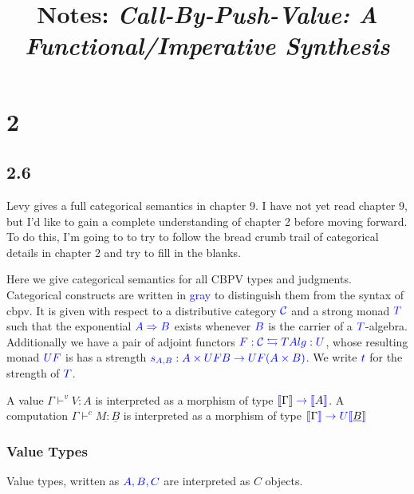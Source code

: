 \documentclass{article}
\title{Notes: \emph{Call-By-Push-Value: A Functional/Imperative Synthesis} }
\newcommand{\sem}[1]{\llbracket #1 \rrbracket}
\newcommand{\gr}[1]{\textcolor{blue}{#1}}
\newcommand{\bk}[1]{\textcolor{black}{#1}}
\begin{document}
\maketitle
 
\section*{2}

\subsection*{2.6}

Levy gives a full categorical semantics in chapter 9. I have not yet read chapter 9, but I'd like to gain a complete understanding of chapter 2 before moving forward. To do this, I'm going to to try to follow the bread crumb trail of categorical details in chapter 2 and try to fill in the blanks. 

Here we give categorical semantics for all CBPV types and judgments. Categorical constructs are written in \gr{gray} to distinguish them from the syntax of cbpv. It is given with respect to a distributive category $\gr{\mathcal C}$ and a strong monad $\gr{T}$ such that the exponential $\gr{A \Rightarrow B}$ exists whenever $\gr{B}$ is the carrier of a $\gr{T}$-algebra. Additionally we have a pair of adjoint functors $\gr{F : \mathcal C \leftrightarrows \mathcal \mathit{TAlg} : U}$, whose resulting monad $\gr{UF}$ is has a strength $\gr{s_{A,B} : A \times UFB \to UF(A \times B)}$. We write $\gr{t}$ for the strength of $\gr{T}$.

A value $\Gamma \vdash^v V : A$ is interpreted as a morphism of type $\gr{\sem{\bk{\Gamma}} \to \sem{\bk{A}}}$. A 
computation $\Gamma \vdash^c M : \underline{B}$ is interpreted as a morphism of type $\gr{\sem{\bk{\Gamma}} \to U\sem{\bk{\underline B}}}$ 

\subsubsection*{Value Types}

Value types, written as $\gr{A,B,C}$ are interpreted as $C$ objects.

\end{document}

